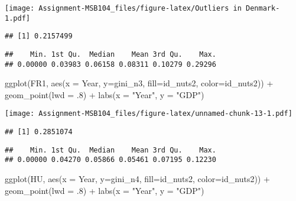 \documentclass[
]{article}
\newenvironment{Shaded}{\begin{snugshade}}{\end{snugshade}}
\newcommand{\AttributeTok}[1]{\textcolor[rgb]{0.77,0.63,0.00}{#1}}
\newcommand{\DecValTok}[1]{\textcolor[rgb]{0.00,0.00,0.81}{#1}}
\newcommand{\FunctionTok}[1]{\textcolor[rgb]{0.00,0.00,0.00}{#1}}
\newcommand{\NormalTok}[1]{#1}
\newcommand{\SpecialCharTok}[1]{\textcolor[rgb]{0.00,0.00,0.00}{#1}}
\newcommand{\StringTok}[1]{\textcolor[rgb]{0.31,0.60,0.02}{#1}}
\begin{document}
\texttt{[image: Assignment-MSB104\_files/figure-latex/Outliers in Denmark-1.pdf]}

\begin{verbatim}
## [1] 0.2157499
\end{verbatim}

\begin{verbatim}
##    Min. 1st Qu.  Median    Mean 3rd Qu.    Max. 
## 0.00000 0.03983 0.06158 0.08311 0.10279 0.29296
\end{verbatim}

\begin{Shaded}
\begin{Highlighting}[]
  \FunctionTok{ggplot}\NormalTok{(FR1, }\FunctionTok{aes}\NormalTok{(}\AttributeTok{x =}\NormalTok{ Year, }\AttributeTok{y=}\NormalTok{gini\_n3, }\AttributeTok{fill=}\NormalTok{id\_nuts2, }\AttributeTok{color=}\NormalTok{id\_nuts2)) }\SpecialCharTok{+}
  \FunctionTok{geom\_point}\NormalTok{(}\AttributeTok{lwd =}\NormalTok{ .}\DecValTok{8}\NormalTok{) }\SpecialCharTok{+}
   \FunctionTok{labs}\NormalTok{(}\AttributeTok{x =} \StringTok{"Year"}\NormalTok{, }\AttributeTok{y =} \StringTok{"GDP"}\NormalTok{)}
\end{Highlighting}
\end{Shaded}

\texttt{[image: Assignment-MSB104\_files/figure-latex/unnamed-chunk-13-1.pdf]}

\begin{verbatim}
## [1] 0.2851074
\end{verbatim}

\begin{verbatim}
##    Min. 1st Qu.  Median    Mean 3rd Qu.    Max. 
## 0.00000 0.04270 0.05866 0.05461 0.07195 0.12230
\end{verbatim}

\begin{Shaded}
\begin{Highlighting}[]
  \FunctionTok{ggplot}\NormalTok{(HU, }\FunctionTok{aes}\NormalTok{(}\AttributeTok{x =}\NormalTok{ Year, }\AttributeTok{y=}\NormalTok{gini\_n4, }\AttributeTok{fill=}\NormalTok{id\_nuts2, }\AttributeTok{color=}\NormalTok{id\_nuts2)) }\SpecialCharTok{+}
  \FunctionTok{geom\_point}\NormalTok{(}\AttributeTok{lwd =}\NormalTok{ .}\DecValTok{8}\NormalTok{) }\SpecialCharTok{+}
   \FunctionTok{labs}\NormalTok{(}\AttributeTok{x =} \StringTok{"Year"}\NormalTok{, }\AttributeTok{y =} \StringTok{"GDP"}\NormalTok{)}
\end{Highlighting}
\end{Shaded}
\end{document}

